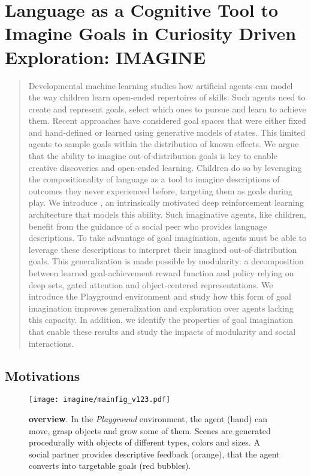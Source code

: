 \chapter{Language as a Cognitive Tool to Imagine Goals in Curiosity Driven Exploration: IMAGINE}

\minitoc

\begin{abstract}
Developmental machine learning studies how artificial agents can model the way children learn open-ended repertoires of skills. Such agents need to create and represent goals, select which ones to pursue and learn to achieve them. Recent approaches have considered goal spaces that were either fixed and hand-defined or learned using generative models of states. This limited agents to sample goals within the distribution of known effects. We argue that the ability to imagine out-of-distribution goals is key to enable creative discoveries and open-ended learning. Children do so by leveraging the compositionality of language as a tool to imagine descriptions of outcomes they never experienced before, targeting them as goals during play. We introduce \imagine, an intrinsically motivated deep reinforcement learning architecture that models this ability. Such imaginative agents, like children, benefit from the guidance of a social peer who provides language descriptions. To take advantage of goal imagination, agents must be able to leverage these descriptions to interpret their imagined out-of-distribution goals. This generalization is made possible by modularity: a decomposition between learned goal-achievement reward function and policy relying on deep sets, gated attention and object-centered representations. We introduce the Playground environment and study how this form of goal imagination improves generalization and exploration over agents lacking this capacity. In addition, we identify the properties of goal imagination that enable these results and study the impacts of modularity and social interactions.
\end{abstract}

\section{Motivations}

\begin{figure}[ht!]
  \centering
    \texttt{[image: imagine/mainfig\_v123.pdf]}
  \caption{\textbf{\imagine overview}. In the \textit{Playground} environment, the agent (hand) can move, grasp objects and grow some of them.
  Scenes are generated procedurally with objects of different types, colors and sizes. A social partner provides descriptive feedback (orange), that the agent converts into targetable goals (red bubbles). \label{fig:main}
}
  \vspace{-.5cm}
\end{figure} 


